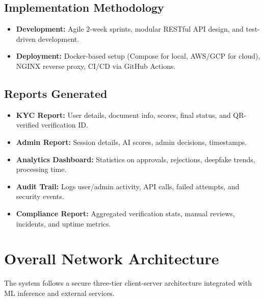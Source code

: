 \documentclass[12pt,a4paper]{article}
\begin{document}
\subsection{Implementation Methodology}

\begin{itemize}
    \item \textbf{Development:} Agile 2-week sprints, modular RESTful API design, and test-driven development.
    \item \textbf{Deployment:} Docker-based setup (Compose for local, AWS/GCP for cloud), NGINX reverse proxy, CI/CD via GitHub Actions.
\end{itemize}

\subsection{Reports Generated}

\begin{itemize}
    \item \textbf{KYC Report:} User details, document info, scores, final status, and QR-verified verification ID.
    \item \textbf{Admin Report:} Session details, AI scores, admin decisions, timestamps.
    \item \textbf{Analytics Dashboard:} Statistics on approvals, rejections, deepfake trends, processing time.
    \item \textbf{Audit Trail:} Logs user/admin activity, API calls, failed attempts, and security events.
    \item \textbf{Compliance Report:} Aggregated verification stats, manual reviews, incidents, and uptime metrics.
\end{itemize}


\section{Overall Network Architecture}

The system follows a secure three-tier client-server architecture integrated with ML inference and external services.
\end{document}
